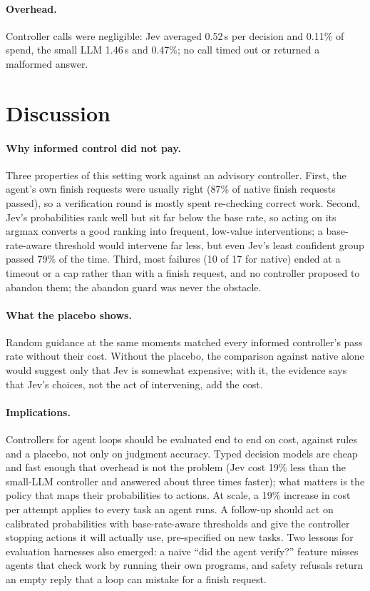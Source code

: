 \documentclass[10pt]{article}
\begin{document}
\paragraph{Overhead.}
Controller calls were negligible: Jev averaged 0.52\,s per decision and 0.11\% of spend, the small LLM 1.46\,s and 0.47\%; no call timed out or returned a malformed answer.

\section{Discussion}

\paragraph{Why informed control did not pay.}
Three properties of this setting work against an advisory controller.
First, the agent's own finish requests were usually right (87\% of native finish requests passed), so a verification round is mostly spent re-checking correct work.
Second, Jev's probabilities rank well but sit far below the base rate, so acting on its argmax converts a good ranking into frequent, low-value interventions; a base-rate-aware threshold would intervene far less, but even Jev's least confident group passed 79\% of the time.
Third, most failures (10 of 17 for native) ended at a timeout or a cap rather than with a finish request, and no controller proposed to abandon them; the abandon guard was never the obstacle.

\paragraph{What the placebo shows.}
Random guidance at the same moments matched every informed controller's pass rate without their cost.
Without the placebo, the comparison against native alone would suggest only that Jev is somewhat expensive; with it, the evidence says that Jev's choices, not the act of intervening, add the cost.

\paragraph{Implications.}
Controllers for agent loops should be evaluated end to end on cost, against rules and a placebo, not only on judgment accuracy.
Typed decision models are cheap and fast enough that overhead is not the problem (Jev cost 19\% less than the small-LLM controller and answered about three times faster); what matters is the policy that maps their probabilities to actions.
At scale, a 19\% increase in cost per attempt applies to every task an agent runs.
A follow-up should act on calibrated probabilities with base-rate-aware thresholds and give the controller stopping actions it will actually use, pre-specified on new tasks.
Two lessons for evaluation harnesses also emerged: a naive ``did the agent verify?'' feature misses agents that check work by running their own programs, and safety refusals return an empty reply that a loop can mistake for a finish request.
\end{document}
